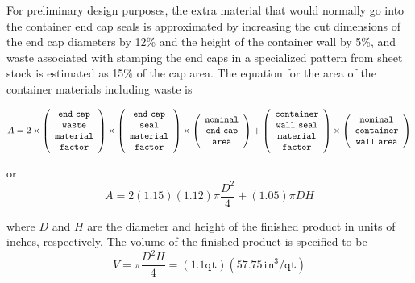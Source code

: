 For preliminary design purposes, the extra material that would
normally go into the container end cap seals is approximated by
increasing the cut dimensions of the end cap diameters by 12\% and the
height of the container wall by 5\%, and waste associated with
stamping the end caps in a specialized pattern from sheet stock is
estimated as 15\% of the cap area. The equation for the area of the
container materials including waste is

\[
A=2 \times \left(\begin{array}{c}
    \mathtt{end\hbox{ }cap}\\
    \mathtt{waste}\\
    \mathtt{material}\\
    \mathtt{factor}
  \end{array} \right)
\times \left(\begin{array}{c}
    \mathtt{end\hbox{ }cap}\\
    \mathtt{seal}\\
    \mathtt{material}\\
    \mathtt{factor}
  \end{array} \right)
\times \left(\begin{array}{c}
    \mathtt{nominal}\\
    \mathtt{end\hbox{ }cap}\\
    \mathtt{area}
  \end{array} \right)
+ \left(\begin{array}{c}
    \mathtt{container}\\
    \mathtt{wall\hbox{ }seal}\\
    \mathtt{material}\\
    \mathtt{factor}
  \end{array} \right)
\times \left(\begin{array}{c}
    \mathtt{nominal}\\
    \mathtt{container}\\
    \mathtt{wall\hbox{ }area}
  \end{array} \right)
\]

or
\begin{equation}
A=2(1.15)(1.12)\pi\frac{D^2}{4}+(1.05)\pi DH \label{additional:contA}
\end{equation}

where $D$ and $H$ are the diameter and height of the finished product
in units of inches, respectively. The volume of the finished product
is specified to be
\begin{equation}
  V=\pi\frac{D^2H}{4}=(1.1\mathtt{qt})(57.75 \mathtt{in}^3/\mathtt{qt})
  \label{additional:contV}
\end{equation}

